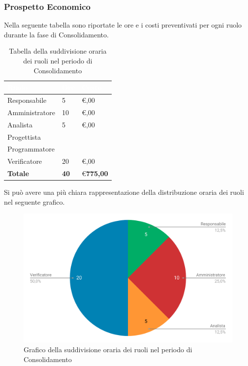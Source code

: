 \subsubsection{Prospetto Economico}
Nella seguente tabella sono riportate le ore e i costi preventivati per ogni ruolo durante la fase di Consolidamento.


\begin{table}[H]	
	\begin{center}
	    \begin{tabular}{C{4cm}C{1cm}C{3,5cm}}
			\textcolor{white}{\textbf{Ruolo}} & \textcolor{white}{\textbf{Ore}} & \textcolor{white}{\textbf{Costo}}
			\\ \hline
			Responsabile & 5 & \euro {},00 \\
			Amministratore & 10 & \euro {},00 \\
			Analista & 5 & \euro {},00 \\
			Progettista &  & \\
			Programmatore &  &  \\
			Verificatore & 20 & \euro {},00 \\
			\textbf{Totale} & \textbf{40} & \euro \space \textbf{775,00} \\
		\end{tabular}
	    \caption{Tabella della suddivisione oraria dei ruoli nel periodo di Consolidamento} \label{tab:tabellaRuoliConsolidamento} 
	\end{center}
\end{table}


Si può avere una più chiara rappresentazione della distribuzione oraria dei ruoli nel seguente grafico.

\begin{figure}[H]
	\includegraphics[width=1\linewidth]{Preventivo/grafici/CO2.pdf}
	\caption{Grafico della suddivisione oraria dei ruoli nel periodo di Consolidamento}
\end{figure}

